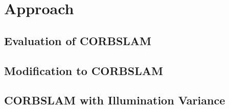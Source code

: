 
\chapter{Approach}

\section{Evaluation of CORBSLAM}

\section{Modification to CORBSLAM}

\section{CORBSLAM with Illumination Variance}




\newpage
